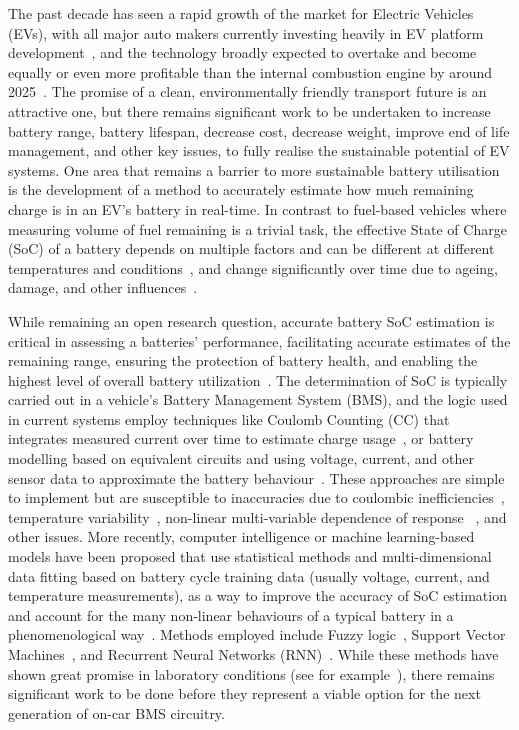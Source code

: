 %
%
The past decade has seen a rapid growth of the market for Electric Vehicles (EVs), with all major auto makers currently investing heavily in EV platform development~\cite{iea_global_2023}, and the technology broadly expected to overtake and become equally or even more profitable than the internal combustion engine by around 2025~\cite{baik_making_2019}.
The promise of a clean, environmentally friendly transport future is an attractive one, but there remains significant work to be undertaken to increase battery range, battery lifespan, decrease cost, decrease weight, improve end of life management, and other key issues, to fully realise the sustainable potential of EV systems.
One area that remains a barrier to more sustainable battery utilisation is the development of a method to accurately estimate how much remaining charge is in an EV's battery in real-time.
In contrast to fuel-based vehicles where measuring volume of fuel remaining is a trivial task, the effective State of Charge (SoC) of a battery depends on multiple factors and can be different at different temperatures and conditions~\cite{xing_state_2014}, and change significantly over time due to ageing, damage, and other influences~\cite{johansson_neural_2018}.

%
%
While remaining an open research question, accurate battery SoC estimation is critical in assessing a batteries' performance, facilitating accurate estimates of the remaining range, ensuring the protection of battery health, and enabling the highest level of overall battery utilization~\cite{yamin_embedded_2014}.
The determination of SoC is typically carried out in a vehicle's Battery Management System (BMS), and the logic used in current systems employ techniques like Coulomb Counting (CC) that integrates measured current over time to estimate charge usage~\cite{robust_SoC}, or battery modelling based on equivalent circuits and using voltage, current, and other sensor data to approximate the battery behaviour~\cite{6953745,ng_enhanced_2009,robust_SoC}.
These approaches are simple to implement but are susceptible to inaccuracies due to coulombic inefficiencies~\cite{Smith_2010}, temperature variability~\cite{xing_state_2014}, non-linear multi-variable dependence of response ~\cite{hansen_support_2005,anton_battery_2013,he_state_2014}, and other issues.
More recently, computer intelligence or machine learning-based models have been proposed that use statistical methods and multi-dimensional data fitting based on battery cycle training data (usually voltage, current, and temperature measurements), as a way to improve the accuracy of SoC estimation and account for the many non-linear behaviours of a typical battery in a phenomenological way~\cite{hansen_support_2005,anton_battery_2013,he_state_2014}.
Methods employed include Fuzzy logic~\cite{malkhandi_fuzzy_2006}, Support Vector Machines~\cite{hansen_support_2005, anton_battery_2013}, and Recurrent Neural Networks (RNN)~\cite{song_lithium-ion_2018,Chemali2017,mamo_long_2020,jiao_gru-rnn_2020,xiao_accurate_2019,javid_adaptive_2020,zhang_deep_2020}.
While these methods have shown great promise in laboratory conditions (see for example~\cite{jiao_gru-rnn_2020}), there remains significant work to be done before they represent a viable option for the next generation of on-car BMS circuitry.

